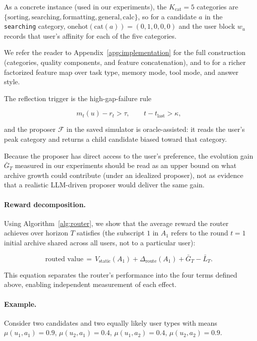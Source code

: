 \documentclass{article} %
\begin{document}
As a concrete instance (used in our experiments), the $K_{\mathrm{cat}}=5$ categories are $\{\text{sorting}, \text{searching}, \text{formatting}, \text{general}, \text{calc}\}$, so for a candidate $a$ in the \texttt{searching} category, $\mathrm{onehot}(\mathrm{cat}(a))=(0,1,0,0,0)$ and the user block $w_u$ records that user's affinity for each of the five categories.

We refer the reader to Appendix~\ref{app:implementation} for the full construction (categories, quality components, and feature concatenation), and to \citet{jin2026personalizing} for a richer factorized feature map over task type, memory mode, tool mode, and answer style.

The reflection trigger is the high-gap-failure rule

\begin{equation}
\label{eq:method-trigger}
m_t(u) - r_t > \tau,\qquad t - t_{\mathrm{last}} > \kappa,
\end{equation}

and the proposer $\mathcal{F}$ in the saved simulator is oracle-assisted: it reads the user's peak category and returns a child candidate biased toward that category.

Because the proposer has direct access to the user's preference, the evolution gain $\bar G_T$ measured in our experiments should be read as an upper bound on what archive growth could contribute (under an idealized proposer), not as evidence that a realistic LLM-driven proposer would deliver the same gain.

\paragraph{Reward decomposition.}
Using Algorithm~\ref{alg:router}, we show that the average reward the router achieves over horizon $T$ satisfies (the subscript $1$ in $A_1$ refers to the round $t=1$ initial archive shared across all users, not to a particular user):

\begin{equation}
\label{eq:method-thesis}
\text{routed value}
\,=\, V_{\mathrm{static}}(A_1) + \Delta_{\mathrm{route}}(A_1) + \bar G_T - \bar L_T.
\end{equation}

This equation separates the router's performance into the four terms defined above, enabling independent measurement of each effect.

\paragraph{Example.} Consider two candidates and two equally likely user types with means $\mu(u_1,a_1)=0.9$, $\mu(u_2,a_1)=0.4$, $\mu(u_1,a_2)=0.4$, $\mu(u_2,a_2)=0.9$.
\end{document}
